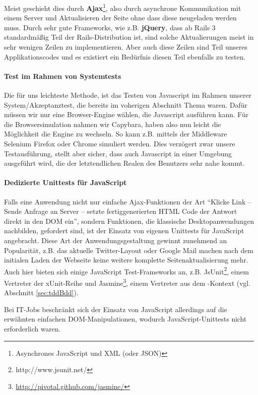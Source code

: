 Meist geschieht dies durch \textbf{Ajax}\footnote{Asynchrones JavaScript und XML (oder JSON)}, also durch asynchrone Kommunikation mit einem Server und Aktualisieren der Seite ohne dass diese neugeladen werden muss. Durch sehr gute Frameworks, wie z.B. \textbf{jQuery}, dass ab Rails 3 standardmäßig Teil der Rails-Distribution ist, sind solche Aktualierungen meist in sehr wenigen Zeilen zu implementieren. Aber auch diese Zeilen sind Teil unseres Applikationscodes und es existiert ein Bedürfnis diesen Teil ebenfalls zu testen.


\paragraph{Test im Rahmen von Systemtests} Die für uns leichteste Methode, ist das Testen von Javascript im Rahmen unserer System/Akzeptanztest, die bereits im voherigen Abschnitt Thema waren. Dafür müssen wir nur eine Browser-Engine wählen, die Javascript ausführen kann. Für die Browsersimulation nahmen wir Capybara, haben also nun leicht die Möglichkeit die Engine zu wechseln. So kann z.B. mittels der Middleware Selenium Firefox oder Chrome simuliert werden. Dies verzögert zwar unsere Testausführung, stellt aber sicher, dass auch Javascript in einer Umgebung ausgeführt wird, die der letztendlichen Realen des Benutzers sehr nahe kommt.
\paragraph{Dedizierte Unittests für JavaScript} Falls eine Anwendung nicht nur einfache Ajax-Funktionen der Art "`Klicke Link -- Sende Anfrage an Server -- setzte fertiggenerierten HTML Code der Antwort direkt in den DOM ein"', sondern Funktionen, die klassische Desktopanwendungen nachbilden, gefordert sind, ist der Einsatz von eigenen Unittests für JavaScript angebracht.
Diese Art der Anwendungsgestaltung gewinnt zunehmend an Popularität, z.B. das aktuelle Twitter-Layout oder Google Mail machen nach dem initialen Laden der Webseite keine weitere komplette Seitenaktualisierung mehr.
Auch hier bieten sich einige JavaScript Test-Frameworks an, z.B. JsUnit\footnote{http://www.jsunit.net/}, einem Vertreter der xUnit-Reihe und Jasmine\footnote{\url{http://pivotal.github.com/jasmine/}}, einem Vertreter aus dem -Kontext (vgl. Abschnitt \ref{sec:tddBdd}).

Bei IT-Jobs beschränkt sich der Einsatz von JavaScript allerdings auf die erwähnten einfachen DOM-Manipulationen, wodurch JavaScript-Unittests nicht erforderlich waren.


